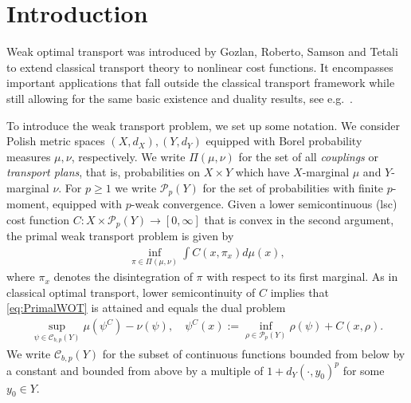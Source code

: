 \documentclass[reqno, a4paper]{amsart}
\newcommand{\cP}{\mathcal{P}}
\newcommand{\Pc}{\cP}
\theoremstyle{definition}
\theoremstyle{definition}
\theoremstyle{definition}
\newcommand{\cpl}{\Pi}
\begin{document}
\maketitle


\section{Introduction}

Weak optimal transport was introduced by Gozlan, Roberto, Samson and Tetali \cite{GoRoSaTe14} to extend classical transport theory to nonlinear cost functions. It  encompasses important applications that fall outside the classical transport framework while still allowing for the same basic existence and duality results, see e.g.\  \cite{GoRoSaSh18, AlBoCh18, BaPa19, BePaRiSc25}.

To introduce the weak transport problem, we set up some notation.
We consider Polish metric spaces $(X,d_X), (Y, d_Y)$ equipped with Borel probability measures $\mu, \nu$, respectively.
We write $\cpl(\mu, \nu)$ for the set of all \emph{couplings} or \emph{transport plans}, that is, probabilities on \(X \times Y\) which have \(X\)-marginal \(\mu\) and \(Y\)-marginal \(\nu\). For $p\geq 1$ we write $\Pc_p(Y)$ for the set of probabilities with finite $p$-moment, equipped with $p$-weak convergence. 
Given a lower semicontinuous (lsc) cost function $C:X\times \Pc_p(Y)\to [0,\infty]$ that is convex in the second argument, the primal weak transport problem is given by
\begin{align}\label{eq:PrimalWOT}
    \inf_{\pi\in\Pi(\mu,\nu)}\int C(x,\pi_x)d\mu(x),
\end{align}
where $\pi_x$ denotes the disintegration of $\pi$ with respect to its first marginal. As in classical optimal transport, lower semicontinuity of $C$ implies that \eqref{eq:PrimalWOT} is attained and equals the dual problem
\begin{align}
    \sup_{\psi \in {\mathcal{C}}_{b,p}(Y)} \mu(\psi^C) - \nu(\psi), \quad \psi^C(x):= \inf_{\rho\in \Pc_p(Y)}\rho(\psi) + C(x,\rho). 
\end{align}
We write $\mathcal C_{b,p}(Y)$ for the subset of continuous functions bounded from below by a constant and bounded from above by a multiple of $1+d_Y(\cdot,y_0)^p$ for some $y_0\in Y$.  
\end{document}
